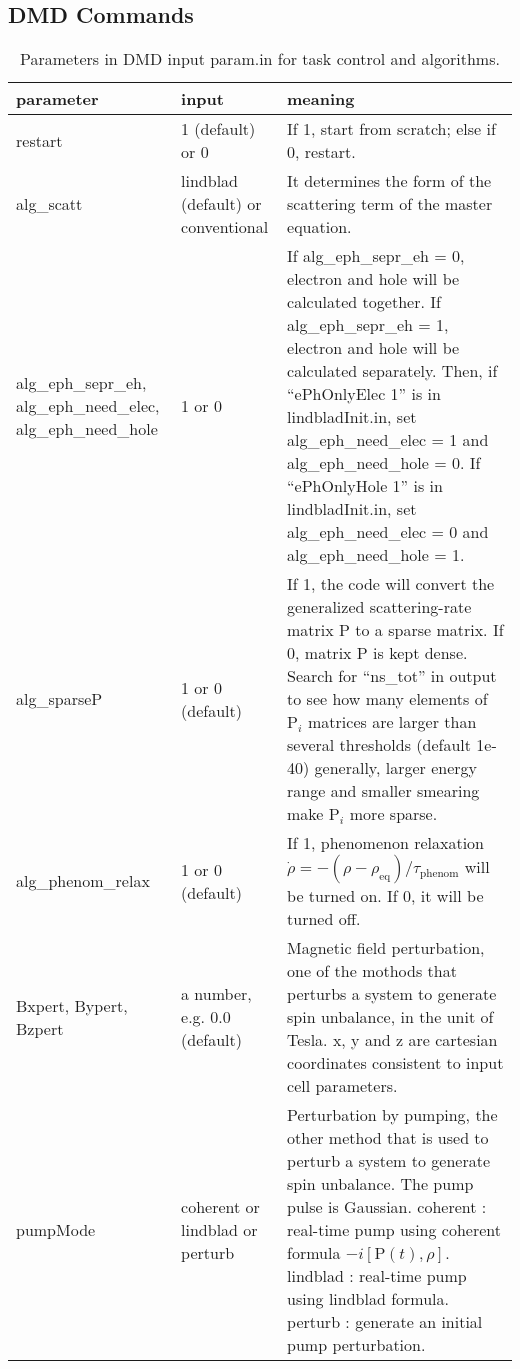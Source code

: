 \documentclass{article}
\begin{document}
\subsection{DMD Commands}
	\begin{xltabular}{\textwidth}{X X X}
		\caption{Parameters in DMD input param.in for task control and algorithms.}\\
		\toprule\toprule
		parameter & input & meaning \\
		\midrule
		
		restart & 1 (default) or 0 & If 1, start from scratch; else if 0, restart.\\
		\midrule
		
		alg\_scatt & lindblad (default) or conventional & It determines the form of the scattering term of the master equation.\\
		\midrule
		
		alg\_eph\_sepr\_eh, alg\_eph\_need\_elec, alg\_eph\_need\_hole & 1 or 0 & If alg\_eph\_sepr\_eh = 0, electron and hole will be calculated together. If alg\_eph\_sepr\_eh = 1, electron and hole will be calculated separately. Then, if ``ePhOnlyElec 1'' is in lindbladInit.in, set  alg\_eph\_need\_elec = 1 and alg\_eph\_need\_hole = 0. If ``ePhOnlyHole 1'' is in lindbladInit.in, set  alg\_eph\_need\_elec = 0 and alg\_eph\_need\_hole = 1.\\
		\midrule
		
		alg\_sparseP & 1 or 0 (default) & If 1, the code will convert the generalized scattering-rate matrix P to a sparse matrix. If 0, matrix P is kept dense. Search for ``ns\_tot'' in output to see how many elements of $\mathrm{P}_i$ matrices are larger than several thresholds (default 1e-40) generally, larger energy range and smaller smearing make $\mathrm{P}_i$ more sparse.\\
		\midrule
		
		alg\_phenom\_relax & 1 or 0 (default) & If 1, phenomenon relaxation $\dot{\rho} = -(\rho - \rho_\text{eq}) / \tau_\text{phenom}$ will be turned on. If 0, it will be turned off.\\
		\midrule
		
		Bxpert, Bypert, Bzpert & a number, e.g. 0.0 (default) & Magnetic field perturbation, one of the mothods that perturbs a system to generate spin unbalance, in the unit of Tesla. x, y and z are cartesian coordinates consistent to input cell parameters.\\
		\midrule
		
		pumpMode & coherent or lindblad or perturb & Perturbation by pumping, the other method that is used to perturb a system to generate spin unbalance. The pump pulse is Gaussian. coherent : real-time pump using coherent formula $-i[\mathrm{P}(t),\rho]$. lindblad : real-time pump using lindblad formula. perturb : generate an initial pump perturbation.\\
		\midrule
		

\end{xltabular}
\end{document}
